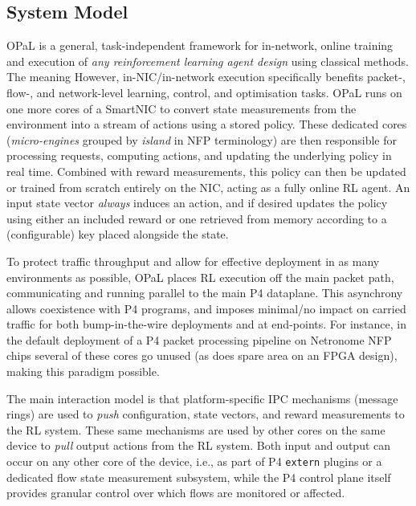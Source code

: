 \documentclass[sigconf,natbib=false]{acmart}
\newcommand{\approachshort}{OPaL}
\begin{document}
\subsection{System Model}
\approachshort{} is a general, task-independent framework for in-network, online training and execution of \emph{any reinforcement learning agent design} using classical methods.
The meaning 
However, in-NIC/in-network execution specifically benefits packet-, flow-, and network-level learning, control, and optimisation tasks.
\approachshort{} runs on one more cores of a SmartNIC to convert state measurements from the environment into a stream of actions using a stored policy.
These dedicated cores (\emph{micro-engines} grouped by \emph{island} in NFP terminology) are then responsible for processing requests, computing actions, and updating the underlying policy in real time.
Combined with reward measurements, this policy can then be updated or trained from scratch entirely on the NIC, acting as a fully online RL agent.
An input state vector \emph{always} induces an action, and if desired updates the policy using either an included reward or one retrieved from memory according to a (configurable) key placed alongside the state.


To protect traffic throughput and allow for effective deployment in as many environments as possible, \approachshort{} places RL execution off the main packet path, communicating and running parallel to the main P4 dataplane.
This asynchrony allows coexistence with P4 programs, and imposes minimal/no impact on carried traffic for both bump-in-the-wire deployments and at end-points.
For instance, in the default deployment of a P4 packet processing pipeline on Netronome NFP chips several of these cores go unused (as does spare area on an FPGA design), making this paradigm possible.

The main interaction model is that platform-specific IPC mechanisms (message rings) are used to \emph{push} configuration, state vectors, and reward measurements to the RL system.
These same mechanisms are used by other cores on the same device to \emph{pull} output actions from the RL system.
Both input and output can occur on any other core of the device, i.e., as part of P4 \texttt{extern} plugins or a dedicated flow state measurement subsystem, while the P4 control plane itself provides granular control over which flows are monitored or affected.
\end{document}
